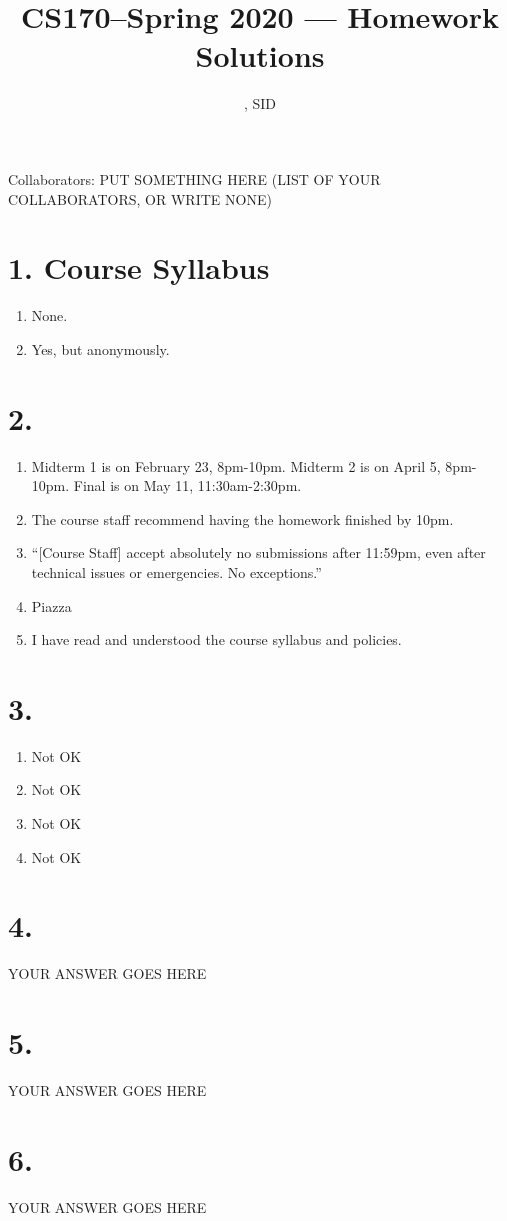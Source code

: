 \documentclass[11pt]{article}
\title{CS170--Spring 2020 --- Homework \Homework Solutions}
\author{\Name, SID \SID}
\date{}
\newenvironment{qparts}{\begin{enumerate}[{(}a{)}]}{\end{enumerate}}
\begin{document}
\maketitle

Collaborators: PUT SOMETHING HERE (LIST OF YOUR COLLABORATORS, OR WRITE NONE)

\section*{1. Course Syllabus}
\begin{qparts}
\item
None.

\item
Yes, but anonymously.
\end{qparts}



\newpage
\section*{2.}
\begin{qparts}
\item
Midterm 1 is on February 23, 8pm-10pm. Midterm 2 is on April 5, 8pm-10pm. Final is on May 11, 11:30am-2:30pm.

\item
The course staff recommend having the homework finished by 10pm.

\item
``[Course Staff] accept absolutely no submissions after 11:59pm, even after technical issues or emergencies. No exceptions.''

\item
Piazza

\item
I have read and understood the course syllabus and policies.

\end{qparts}


\newpage
\section*{3.}
\begin{qparts}
\item
Not OK
\item
Not OK
\item
Not OK
\item
Not OK
\end{qparts}


\newpage
\section*{4.}
YOUR ANSWER GOES HERE


\newpage
\section*{5.}
YOUR ANSWER GOES HERE


\newpage
\section*{6.}
YOUR ANSWER GOES HERE
\end{document}
